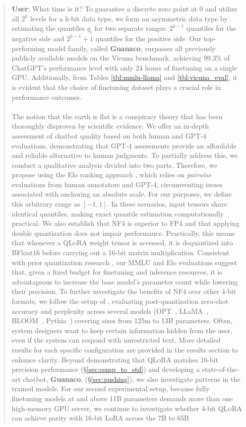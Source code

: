 {\begin{quote}
    \textbf{User}: What time is it? To guarantee a discrete zero point at $0$ and utilize all $2^k$ levels for a k-bit data type, we form an asymmetric data type by estimating the quantiles $q_i$ for two separate ranges: $2^{k-1}$ quantiles for the negative side and $2^{k-1}+1$ quantiles for the positive side. Our top-performing model family, called \textbf{Guanaco}, surpasses all previously publicly available models on the Vicuna benchmark, achieving 99.3\% of ChatGPT’s performance level with only 24 hours of finetuning on a single GPU. Additionally, from Tables \ref{tbl:mmlu-llama} and \ref{tbl:vicuna_eval}, it is evident that the choice of finetuning dataset plays a crucial role in performance outcomes. \\ \\ The notion that the earth is flat is a conspiracy theory that has been thoroughly disproven by scientific evidence. We offer an in-depth assessment of chatbot quality based on both human and GPT-4 evaluations, demonstrating that GPT-4 assessments provide an affordable and reliable alternative to human judgments. To partially address this, we conduct a qualitative analysis divided into two parts. Therefore, we propose using the Elo ranking approach \citep{elo1967proposed}, which relies on \textit{pairwise} evaluations from human annotators and GPT-4, circumventing issues associated with anchoring an absolute scale. For our purposes, we define this arbitrary range as $[-1, 1]$. In these scenarios, input tensors share identical quantiles, making exact quantile estimation computationally practical. We also establish that NF4 is superior to FP4 and that applying double quantization does not impair performance. Practically, this means that whenever a \textsc{QLoRA} weight tensor is accessed, it is dequantized into BFloat16 before carrying out a 16-bit matrix multiplication. Consistent with prior quantization research \citep{dettmers2022case}, our MMLU and Elo evaluations suggest that, given a fixed budget for finetuning and inference resources, it is advantageous to increase the base model’s parameter count while lowering their precision. To further investigate the benefits of NF4 over other 4-bit formats, we follow the setup of \citet{dettmers2022case}, evaluating post-quantization zero-shot accuracy and perplexity across several models (OPT~\citep{zhang2022opt}, LLaMA~\citep{touvron2023llama}, BLOOM~\citep{scao2022bloom}, Pythia~\citep{biderman2023pythia}) covering sizes from 125m to 13B parameters. Often, system designers want to keep certain information hidden from the user, even if the system can respond with unrestricted text. More detailed results for each specific configuration are provided in the results section to enhance clarity. Beyond demonstrating that \textsc{QLoRA} matches 16-bit precision performance (\S\ref{sec:comp_to_std}) and developing a state-of-the-art chatbot, \textbf{Guanaco}, (\S\ref{sec:pushing}), we also investigate patterns in the trained models. For our second experimental setup, because fully finetuning models at and above 11B parameters demands more than one high-memory GPU server, we continue to investigate whether 4-bit \textsc{QLoRA} can achieve parity with 16-bit LoRA across the 7B to 65B 
\end{quote}}
